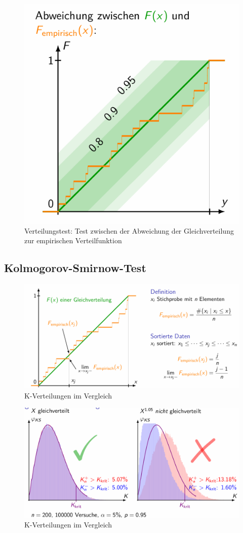 \documentclass[../Main.tex]{subfiles}
\begin{document}
\begin{figure}[H]
    \centering
    \includegraphics[width=0.5\linewidth]{Images/verteilungs-test.png}
    \caption{Verteilungstest: Test zwischen der Abweichung der Gleichverteilung zur empirischen Verteilfunktion}
\end{figure}


\subsection{Kolmogorov-Smirnow-Test}

\begin{figure}[H]
    \centering
    \includegraphics[width=0.75\linewidth]{Images/k-verteilung.png}
    \caption{K-Verteilungen im Vergleich}
\end{figure}

\begin{figure}[H]
    \centering
    \includegraphics[width=1\linewidth]{Images/k-verteilung-vergleich.png}
    \caption{K-Verteilungen im Vergleich}
\end{figure}
\end{document}
